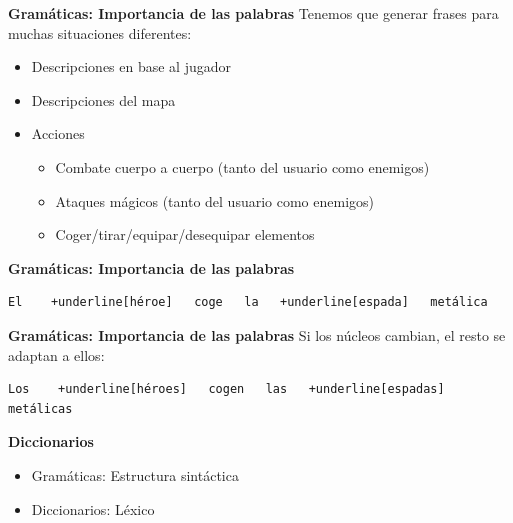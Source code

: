 \begin{frame}[t, fragile]{\textbf{Gramáticas: Importancia de las palabras}}
	Tenemos que generar frases para muchas situaciones diferentes:
	\begin{itemize}
		\item Descripciones en base al jugador
		\item Descripciones del mapa
		\item<+-| alert@+> Acciones
			\begin{itemize}
				\item Combate cuerpo a cuerpo (tanto del usuario como enemigos)
				\item Ataques mágicos (tanto del usuario como enemigos)
				\item Coger/tirar/equipar/desequipar elementos
			\end{itemize}
	\end{itemize}
\end{frame}

\begin{frame}[t, fragile]{\textbf{Gramáticas: Importancia de las palabras}}
	\vspace*{\fill}
		\begin{Verbatim}[commandchars=+\[\]]
El    +underline[héroe]   coge   la   +underline[espada]   metálica
		\end{Verbatim}
	\vspace*{\fill}
\end{frame}

\begin{frame}[t, fragile]{\textbf{Gramáticas: Importancia de las palabras}}
	Si los núcleos cambian, el resto se adaptan a ellos:
	\vspace*{\fill}
		\begin{Verbatim}[commandchars=+\[\]]
Los    +underline[héroes]   cogen   las   +underline[espadas]   metálicas
		\end{Verbatim}
	\vspace*{\fill}
\end{frame}


\begin{tframe}{\textbf{Diccionarios}}
	\begin{itemize}
		\item Gramáticas: Estructura sintáctica
		\item<+-| alert@+> Diccionarios: Léxico
	\end{itemize}
\end{tframe}

